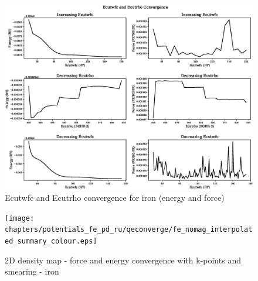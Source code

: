 \begin{landscape}
\FloatBarrier
\begin{figure}
    \begin{center}
        \includegraphics[scale=0.70]{chapters/potentials_fe_pd_ru/qeconverge/fe_nomag_ecut_convergence_ry.eps}
        \caption{Ecutwfc and Ecutrho convergence for iron (energy and force)}
      \label{image:ironecut}
    \end{center}
\end{figure}
\FloatBarrier
\end{landscape}

\clearpage

\begin{landscape}
\FloatBarrier
\begin{figure}
    \begin{center}
        \texttt{[image: chapters/potentials\_fe\_pd\_ru/qeconverge/fe\_nomag\_interpolated\_summary\_colour.eps]}
        \caption{2D density map - force and energy convergence with k-points and smearing - iron}
      \label{image:ironkpointsmearing}
    \end{center}
\end{figure}
\FloatBarrier
\end{landscape}

\clearpage

